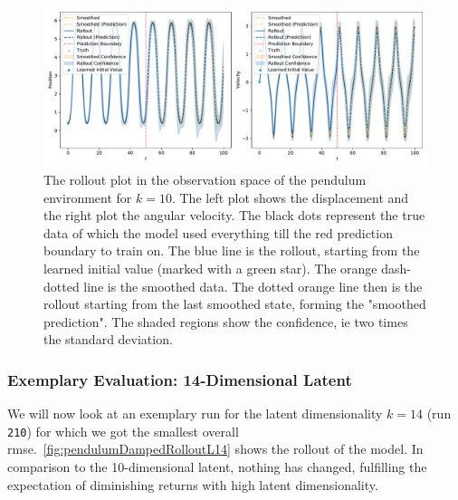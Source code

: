 			\begin{figure}
				\centering
				\includegraphics[width=\linewidth]{figures/results/pendulum/run-latent-dim-10/rollout-observations-N0.pdf}
				\caption{The rollout plot in the observation space of the pendulum environment for \(k = 10\). The left plot shows the displacement and the right plot the angular velocity. The black dots represent the true data of which the model used everything till the red prediction boundary to train on. The blue line is the rollout, starting from the learned initial value (marked with a green star). The orange dash-dotted line is the smoothed data. The dotted orange line then is the rollout starting from the last smoothed state, forming the "smoothed prediction". The shaded regions show the confidence, \ac{ie} two times the standard deviation.}
				\label{fig:pendulumRolloutL10}
			\end{figure}

		\subsubsection{Exemplary Evaluation: 14-Dimensional Latent}
			We will now look at an exemplary run for the latent dimensionality \( k = 14 \) (run \texttt{210}) for which we got the smallest overall \ac{rmse}.~\autoref{fig:pendulumDampedRolloutL14} shows the rollout of the model. In comparison to the 10-dimensional latent, nothing has changed, fulfilling the expectation of diminishing returns with high latent dimensionality.

